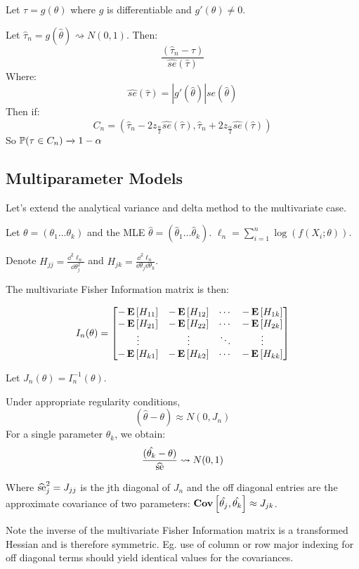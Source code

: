 \documentclass[10pt]{article}
\begin{document}
\begin{definition}
    Let $\tau = g(\theta)$ where $g$ is differentiable and $g'(\theta) \neq 0$.

    Let $\hat{\tau}_n = g(\hat{\theta}) \rightsquigarrow N(0, 1)$.
    Then:
    \[ \frac{(\hat{\tau}_n - \tau)}{\hat{se}(\hat{\tau})} \]
    Where: 
    \[\hat{se}(\hat{\tau}) = |g'(\hat{\theta})|se(\hat{\theta})\]
    Then if:
    \[ C_n = (\hat{\tau}_n - 2z_{\frac{\alpha}{2}}\hat{se}(\hat{\tau}),
    \hat{\tau}_n + 2z_{\frac{\alpha}{2}}\hat{se}(\hat{\tau})) \]
    So $\P(\tau \in C_n) \xrightarrow{} 1-\alpha$
\end{definition}

\subsection{Multiparameter Models}

Let's extend the analytical variance and delta method to the multivariate case.

Let $\theta = (\theta_1 \dots \theta_k)$ and the MLE $\hat{\theta} =
(\hat{\theta}_1 \dots \hat{\theta}_k)$. $\ell_n = \sum_{i=1}^n \log(f(X_i;
\theta))$.

Denote $H_{jj} = \frac{\dd^2\ell_n}{\dd \theta_j^2}$ and $H_{jk} =
\frac{\dd^2\ell_n}{\dd \theta_j \dd \theta_k}$.

The multivariate Fisher Information matrix is then:

\[I_n(\theta) = \bmat{-\E{H_{11}} & -\E{H_{12}} & \cdots & -\E{H_{1k}} \\ -\E{H_{21}} & -\E{H_{22}} & \cdots & -\E{H_{2k}} \\ \vdots & \vdots & \ddots & \vdots \\ -\E{H_{k1}} & -\E{H_{k2}} & \cdots & -\E{H_{kk}}}\]

Let $J_n(\theta) = I_n^{-1}(\theta)$.

\begin{theorem}
Under appropriate regularity conditions,
\[(\hat{\theta} - \theta) \approx N(0, J_n)\]
For a single parameter $\theta_k$, we obtain:
\[\frac{(\hat{\theta_k} - \theta)}{\widehat{\se}} \rightsquigarrow N(0, 1)\]

Where $\widehat{\se}_j^2 = J_{jj}$ is the jth diagonal of $J_n$ and the off
diagonal entries are the approximate covariance of two parameters:
$\Cov{\hat{\theta_j}, \hat{\theta_k}} \approx J_{jk}$.
\end{theorem}

Note the inverse of the multivariate Fisher Information matrix is a transformed
Hessian and is therefore symmetric. Eg. use of column or row major indexing for
off diagonal terms should yield identical values for the covariances.
\end{document}
